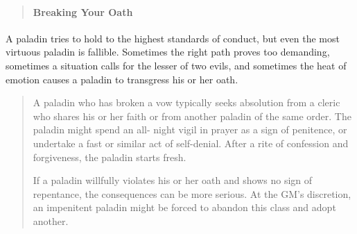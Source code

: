 \documentclass[
]{article}
\begin{document}
\begin{quote}
\mbox{}%
\hypertarget{breaking-your-oath}{%
\paragraph{Breaking Your Oath}\label{breaking-your-oath}}
\end{quote}

A paladin tries to hold to the highest standards of conduct, but even
the most virtuous paladin is fallible. Sometimes the right path proves
too demanding, sometimes a situation calls for the lesser of two evils,
and sometimes the heat of emotion causes a paladin to transgress his or
her oath.

\begin{quote}
A paladin who has broken a vow typically seeks absolution from a cleric
who shares his or her faith or from another paladin of the same order.
The paladin might spend an all- night vigil in prayer as a sign of
penitence, or undertake a fast or similar act of self-denial. After a
rite of confession and forgiveness, the paladin starts fresh.

If a paladin willfully violates his or her oath and shows no sign of
repentance, the consequences can be more serious. At the GM's
discretion, an impenitent paladin might be forced to abandon this class
and adopt another.
\end{quote}
\end{document}
